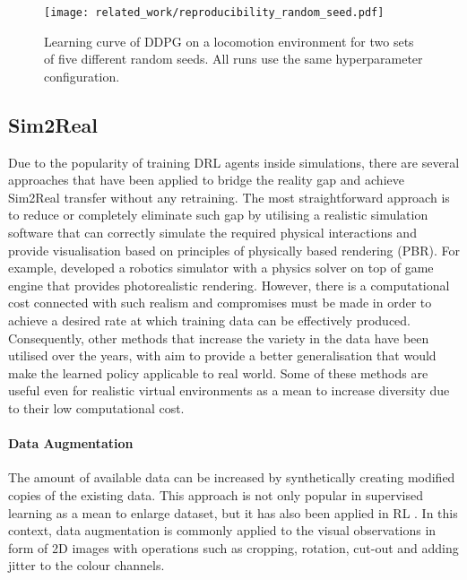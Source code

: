 \begin{figure}[hb]
    \centering
    \texttt{[image: related\_work/reproducibility\_random\_seed.pdf]}
    \caption{Learning curve of DDPG on a locomotion environment for two sets of five different random seeds. All runs use the same hyperparameter configuration.~\protect\cite{henderson_deep_2018}}
    \label{fig:reproducibility_random_seed}
\end{figure}


\subsection{Sim2Real}\label{subsec:sim2real}

Due to the popularity of training DRL agents inside simulations, there are several approaches that have been applied to bridge the reality gap and achieve Sim2Real transfer without any retraining. The most straightforward approach is to reduce or completely eliminate such gap by utilising a realistic simulation software that can correctly simulate the required physical interactions and provide visualisation based on principles of physically based rendering (PBR). For example, \citet{iqbal_toward_2020} developed a robotics simulator with a physics solver on top of game engine that provides photorealistic rendering. However, there is a computational cost connected with such realism and compromises must be made in order to achieve a desired rate at which training data can be effectively produced. Consequently, other methods that increase the variety in the data have been utilised over the years, with aim to provide a better generalisation that would make the learned policy applicable to real world. Some of these methods are useful even for realistic virtual environments as a mean to increase diversity due to their low computational cost.

\paragraph{Data Augmentation} The amount of available data can be increased by synthetically creating modified copies of the existing data. This approach is not only popular in supervised learning as a mean to enlarge dataset, but it has also been applied in RL \cite{zhang_towards_2015, laskin_reinforcement_2020, zhan_framework_2020}. In this context, data augmentation is commonly applied to the visual observations in form of 2D images with operations such as cropping, rotation, cut-out and adding jitter to the colour channels.

